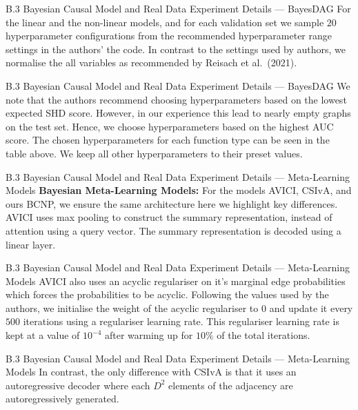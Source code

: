 \documentclass[aspectratio=169,10pt]{beamer}
\begin{document}
\begin{frame}{B.3 Bayesian Causal Model and Real Data Experiment Details --- BayesDAG}
\small
For the linear and the non-linear models, and for each validation set we sample $20$ hyperparameter configurations from the recommended hyperparameter range settings in the authors' the code. In contrast to the settings used by authors, we normalise the all variables as recommended by Reisach et al.\ (2021).
\end{frame}

\begin{frame}{B.3 Bayesian Causal Model and Real Data Experiment Details --- BayesDAG}
\small
We note that the authors recommend choosing hyperparameters based on the lowest expected SHD score. However, in our experience this lead to nearly empty graphs on the test set. Hence, we choose hyperparameters based on the highest AUC score. The chosen hyperparameters for each function type can be seen in the table above. We keep all other hyperparameters to their preset values.
\end{frame}

\begin{frame}{B.3 Bayesian Causal Model and Real Data Experiment Details --- Meta-Learning Models}
\small
\textbf{Bayesian Meta-Learning Models:}\quad
For the models AVICI, CSIvA, and ours BCNP, we ensure the same architecture here we highlight key differences. AVICI uses max pooling to construct the summary representation, instead of attention using a query vector. The summary representation is decoded using a linear layer.
\end{frame}

\begin{frame}{B.3 Bayesian Causal Model and Real Data Experiment Details --- Meta-Learning Models}
\small
AVICI also uses an acyclic regulariser on it's marginal edge probabilities which forces the probabilities to be acyclic. Following the values used by the authors, we initialise the weight of the acyclic regulariser to $0$ and update it every $500$ iterations using a regulariser learning rate. This regulariser learning rate is kept at a value of $10^{-4}$ after warming up for $10\%$ of the total iterations.
\end{frame}

\begin{frame}{B.3 Bayesian Causal Model and Real Data Experiment Details --- Meta-Learning Models}
In contrast, the only difference with CSIvA is that it uses an autoregressive decoder where each $D^2$ elements of the adjacency are autoregressively generated.
\end{frame}
\end{document}
